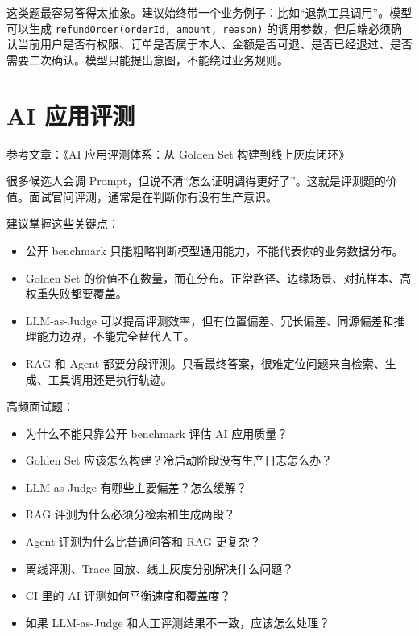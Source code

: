 \documentclass[9pt,a4paper,twocolumn]{ctexart}
\begin{document}
这类题最容易答得太抽象。建议始终带一个业务例子：比如“退款工具调用”。模型可以生成 \texttt{refundOrder(orderId, amount, reason)} 的调用参数，但后端必须确认当前用户是否有权限、订单是否属于本人、金额是否可退、是否已经退过、是否需要二次确认。模型只能提出意图，不能绕过业务规则。



\section*{AI 应用评测}


参考文章：《AI 应用评测体系：从 Golden Set 构建到线上灰度闭环》



很多候选人会调 Prompt，但说不清“怎么证明调得更好了”。这就是评测题的价值。面试官问评测，通常是在判断你有没有生产意识。



建议掌握这些关键点：


\begin{itemize}[itemsep=1pt, topsep=2pt]
  \item 公开 benchmark 只能粗略判断模型通用能力，不能代表你的业务数据分布。
  \item Golden Set 的价值不在数量，而在分布。正常路径、边缘场景、对抗样本、高权重失败都要覆盖。
  \item LLM-as-Judge 可以提高评测效率，但有位置偏差、冗长偏差、同源偏差和推理能力边界，不能完全替代人工。
  \item RAG 和 Agent 都要分段评测。只看最终答案，很难定位问题来自检索、生成、工具调用还是执行轨迹。
\end{itemize}


高频面试题：


\begin{itemize}[itemsep=1pt, topsep=2pt]
  \item 为什么不能只靠公开 benchmark 评估 AI 应用质量？
  \item Golden Set 应该怎么构建？冷启动阶段没有生产日志怎么办？
  \item LLM-as-Judge 有哪些主要偏差？怎么缓解？
  \item RAG 评测为什么必须分检索和生成两段？
  \item Agent 评测为什么比普通问答和 RAG 更复杂？
  \item 离线评测、Trace 回放、线上灰度分别解决什么问题？
  \item CI 里的 AI 评测如何平衡速度和覆盖度？
  \item 如果 LLM-as-Judge 和人工评测结果不一致，应该怎么处理？
\end{itemize}
\end{document}
